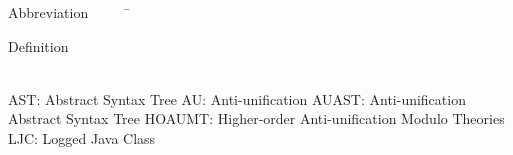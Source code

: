 

\begin{tabbing}
Abbreviation~~~~~\= \ \ \ \ \ \ \ \ \ \ \ \ \ \ \ \ \ \ \ \ \ \ \ \ \ \ \ \ \ \ \ \ \ \ \ \  \parbox{5in}{Definition}\\

\addsymbol \mbox{AST}: {Abstract Syntax Tree}
\addsymbol \mbox{AU}: {Anti-unification}
\addsymbol \mbox{AUAST}: {Anti-unification Abstract Syntax Tree}
\addsymbol \mbox{HOAUMT}: {Higher-order Anti-unification Modulo Theories}
\addsymbol \mbox{LJC}: {Logged Java Class}



\end{tabbing}

